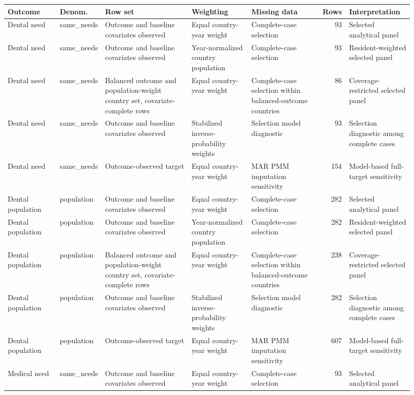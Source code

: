 \begin{tabular}{p{0.13\linewidth}p{0.08\linewidth}p{0.22\linewidth}p{0.15\linewidth}p{0.18\linewidth}rp{0.16\linewidth}}
\toprule
Outcome & Denom. & Row set & Weighting & Missing data & Rows & Interpretation \\
\midrule
Dental need & same\_needs & Outcome and baseline covariates observed & Equal country-year weight & Complete-case selection & 93 & Selected analytical panel \\
Dental need & same\_needs & Outcome and baseline covariates observed & Year-normalized country population & Complete-case selection & 93 & Resident-weighted selected panel \\
Dental need & same\_needs & Balanced outcome and population-weight country set, covariate-complete rows & Equal country-year weight & Complete-case selection within balanced-outcome countries & 86 & Coverage-restricted selected panel \\
Dental need & same\_needs & Outcome and baseline covariates observed & Stabilized inverse-probability weights & Selection model diagnostic & 93 & Selection diagnostic among complete cases \\
Dental need & same\_needs & Outcome-observed target & Equal country-year weight & MAR PMM imputation sensitivity & 154 & Model-based full-target sensitivity \\
Dental population & population & Outcome and baseline covariates observed & Equal country-year weight & Complete-case selection & 282 & Selected analytical panel \\
Dental population & population & Outcome and baseline covariates observed & Year-normalized country population & Complete-case selection & 282 & Resident-weighted selected panel \\
Dental population & population & Balanced outcome and population-weight country set, covariate-complete rows & Equal country-year weight & Complete-case selection within balanced-outcome countries & 238 & Coverage-restricted selected panel \\
Dental population & population & Outcome and baseline covariates observed & Stabilized inverse-probability weights & Selection model diagnostic & 282 & Selection diagnostic among complete cases \\
Dental population & population & Outcome-observed target & Equal country-year weight & MAR PMM imputation sensitivity & 607 & Model-based full-target sensitivity \\
Medical need & same\_needs & Outcome and baseline covariates observed & Equal country-year weight & Complete-case selection & 93 & Selected analytical panel \\

\end{tabular}
